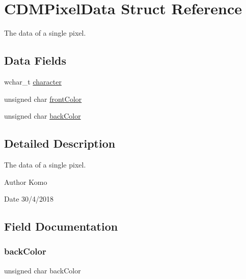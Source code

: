 \hypertarget{struct_c_d_m_pixel_data}{}\section{C\+D\+M\+Pixel\+Data Struct Reference}
\label{struct_c_d_m_pixel_data}


The data of a single pixel.  


\subsection*{Data Fields}
\begin{DoxyCompactItemize}
\item 
wchar\+\_\+t \mbox{\hyperlink{struct_c_d_m_pixel_data_aae9a9e2d9df809dee7b9ed31e7d99fae}{character}}
\item 
unsigned char \mbox{\hyperlink{struct_c_d_m_pixel_data_afb6f4c281a6ee8c9f689ee0980ae756d}{front\+Color}}
\item 
unsigned char \mbox{\hyperlink{struct_c_d_m_pixel_data_ad85b1951998b87079fe7ef92ac323ce5}{back\+Color}}
\end{DoxyCompactItemize}


\subsection{Detailed Description}
The data of a single pixel. 

\begin{DoxyAuthor}{Author}
Komo 
\end{DoxyAuthor}
\begin{DoxyDate}{Date}
30/4/2018 
\end{DoxyDate}


\subsection{Field Documentation}
\mbox{\label{struct_c_d_m_pixel_data_ad85b1951998b87079fe7ef92ac323ce5}} 
\subsubsection{\texorpdfstring{back\+Color}{backColor}}
{\footnotesize\ttfamily unsigned char back\+Color}

